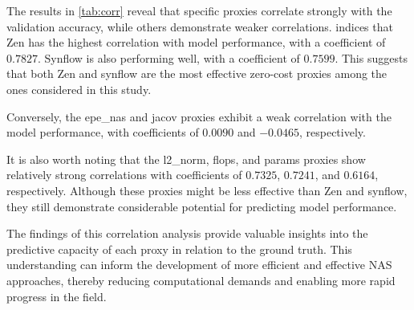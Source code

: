 The results in \cref{tab:corr} reveal that specific proxies correlate strongly with the validation accuracy, while others demonstrate weaker correlations.  indices that Zen has the highest correlation with model performance, with a coefficient of $0.7827$. \gls{Synflow} is also performing well, with a coefficient of $0.7599$. This suggests that both Zen and \gls{synflow} are the most effective zero-cost proxies among the ones considered in this study. 

Conversely, the epe\_nas and jacov proxies exhibit a weak correlation with the model performance, with coefficients of $0.0090$ and $-0.0465$, respectively. 

It is also worth noting that the l2\_norm, \gls{flops}, and params proxies show relatively strong correlations with coefficients of $0.7325$, $0.7241$, and $0.6164$, respectively. Although these proxies might be less effective than Zen and \gls{synflow}, they still demonstrate considerable potential for predicting model performance.

The findings of this correlation analysis provide valuable insights into the predictive capacity of each proxy in relation to the ground truth. This understanding can inform the development of more efficient and effective \gls{NAS} approaches, thereby reducing computational demands and enabling more rapid progress in the field.